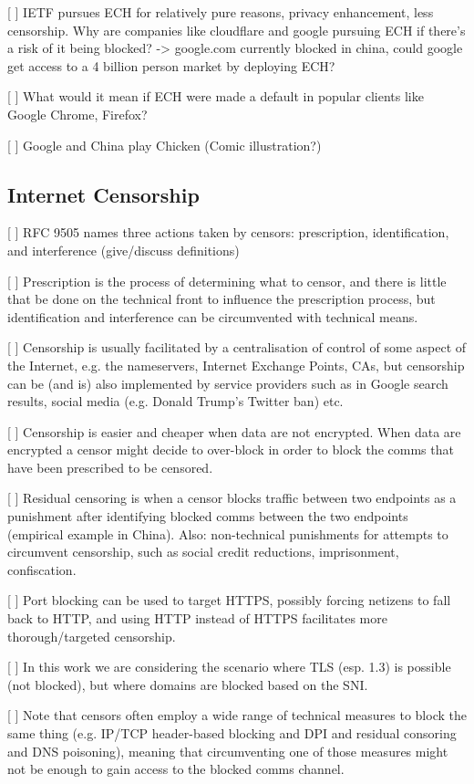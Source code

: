 [ ] IETF pursues ECH for relatively pure reasons, privacy enhancement, less censorship. Why are companies like cloudflare and google pursuing ECH if there's a risk of it being blocked? -> google.com currently blocked in china, could google get access to a 4 billion person market by deploying ECH?

[ ] What would it mean if ECH were made a default in popular clients like Google Chrome, Firefox?

[ ] Google and China play Chicken (Comic illustration?)
\subsection{Internet Censorship}

[ ] RFC 9505 names three actions taken by censors: prescription, identification, and interference (give/discuss definitions)

[ ] Prescription is the process of determining what to censor, and there is little that be done on the technical front to influence the prescription process, but identification and interference can be circumvented with technical means.

[ ] Censorship is usually facilitated by a centralisation of control of some aspect of the Internet, e.g. the nameservers, Internet Exchange Points, CAs, but censorship can be (and is) also implemented by service providers such as in Google search results, social media (e.g. Donald Trump's Twitter ban) etc.

[ ] Censorship is easier and cheaper when data are not encrypted. When data are encrypted a censor might decide to over-block in order to block the comms that have been prescribed to be censored.

[ ] Residual censoring is when a censor blocks traffic between two endpoints as a punishment after identifying blocked comms between the two endpoints (empirical example in China). Also: non-technical punishments for attempts to circumvent censorship, such as social credit reductions, imprisonment, confiscation.

[ ] Port blocking can be used to target HTTPS, possibly forcing netizens to fall back to HTTP, and using HTTP instead of HTTPS facilitates more thorough/targeted censorship.

[ ] In this work we are considering the scenario where TLS (esp. 1.3) is possible (not blocked), but where domains are blocked based on the SNI.

[ ] Note that censors often employ a wide range of technical measures to block the same thing (e.g. IP/TCP header-based blocking and DPI and residual consoring and DNS poisoning), meaning that circumventing one of those measures might not be enough to gain access to the blocked comms channel.

